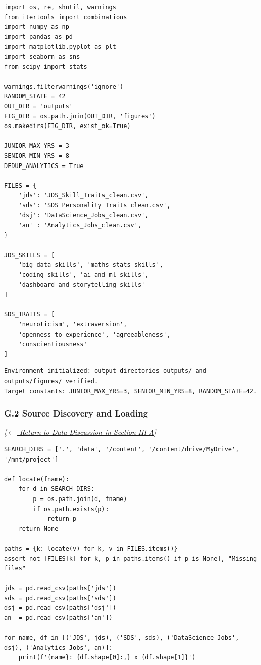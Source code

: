 \documentclass[conference]{IEEEtran}
\begin{document}
\begin{lstlisting}[style=pythonstyle,caption={Notebook setup, directory creation, file mappings, and constants.},label={lst:setup_code}]
import os, re, shutil, warnings
from itertools import combinations
import numpy as np
import pandas as pd
import matplotlib.pyplot as plt
import seaborn as sns
from scipy import stats

warnings.filterwarnings('ignore')
RANDOM_STATE = 42
OUT_DIR = 'outputs'
FIG_DIR = os.path.join(OUT_DIR, 'figures')
os.makedirs(FIG_DIR, exist_ok=True)

JUNIOR_MAX_YRS = 3
SENIOR_MIN_YRS = 8
DEDUP_ANALYTICS = True

FILES = {
    'jds': 'JDS_Skill_Traits_clean.csv',
    'sds': 'SDS_Personality_Traits_clean.csv',
    'dsj': 'DataScience_Jobs_clean.csv',
    'an' : 'Analytics_Jobs_clean.csv',
}

JDS_SKILLS = [
    'big_data_skills', 'maths_stats_skills',
    'coding_skills', 'ai_and_ml_skills',
    'dashboard_and_storytelling_skills'
]

SDS_TRAITS = [
    'neuroticism', 'extraversion',
    'openness_to_experience', 'agreeableness',
    'conscientiousness'
]
\end{lstlisting}

\begin{lstlisting}[style=outputstyle,caption={Execution Output G.1: Environment Initialization.},label={out:setup}]
Environment initialized: output directories outputs/ and outputs/figures/ verified.
Target constants: JUNIOR_MAX_YRS=3, SENIOR_MIN_YRS=8, RANDOM_STATE=42.
\end{lstlisting}

\subsubsection*{G.2 Source Discovery and Loading}
\label{lst:loading}
\textit{\hyperref[sec:data_quality]{[$\leftarrow$ Return to Data Discussion in Section III-A]}}

\begin{lstlisting}[style=pythonstyle,caption={Locating the four CSV inputs and loading them into pandas frames.},label={lst:loading_code}]
SEARCH_DIRS = ['.', 'data', '/content', '/content/drive/MyDrive', '/mnt/project']

def locate(fname):
    for d in SEARCH_DIRS:
        p = os.path.join(d, fname)
        if os.path.exists(p):
            return p
    return None

paths = {k: locate(v) for k, v in FILES.items()}
assert not [FILES[k] for k, p in paths.items() if p is None], "Missing files"

jds = pd.read_csv(paths['jds'])
sds = pd.read_csv(paths['sds'])
dsj = pd.read_csv(paths['dsj'])
an  = pd.read_csv(paths['an'])

for name, df in [('JDS', jds), ('SDS', sds), ('DataScience Jobs', dsj), ('Analytics Jobs', an)]:
    print(f'{name}: {df.shape[0]:,} x {df.shape[1]}')
\end{lstlisting}
\end{document}
